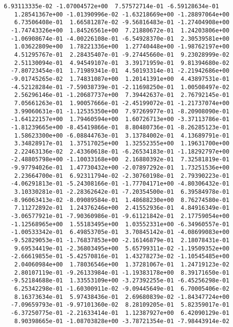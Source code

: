 \documentclass[11pt]{article}
\begin{document}
\begin{Verbatim}[commandchars=\\\{\}]
   6.93113335e-02 -1.07004572e+00  7.57572714e-01 -6.59128634e-01
   1.28541367e+00 -1.01390996e-02 -1.63218669e+00 -1.28897064e+00
   6.73506408e-01  1.66581287e-02 -9.56816483e-01 -1.27404908e+00
  -1.74743326e+00  1.84526561e+00  7.21880672e-01  1.24203806e+00
  -1.06908674e-01 -4.00226108e-01 -6.54928370e-01  2.30539581e+00
   1.03622809e+00  1.78221336e+00  1.27740448e+00 -1.98762197e+00
   4.51295767e-01  2.28435407e-01 -9.27445660e-01  9.23028999e-02
   2.51130094e-01  4.94549107e-01  3.39171959e-01  9.81394680e-02
  -7.80723454e-01  1.71989341e-01  4.50193314e-01 -2.21942686e+00
  -9.01745265e-02  1.74831087e+00  1.20141391e+00  4.43897531e-01
  -4.52128284e-01 -7.59038739e-01 -2.11698250e-01  1.00508497e-02
   2.56296146e-01 -1.20687737e+00  7.39442637e-01  2.76792145e-01
   7.05661263e-01  1.90057666e-01 -2.45199072e-01 -1.21737074e+00
   3.99060631e-01 -1.12535350e+00  7.97269977e-01 -8.20908090e-01
  -1.64122157e+00  1.79460594e+00  1.60726713e+00 -3.37113786e-01
  -1.81239665e+00 -8.45419866e-01  8.80480736e-01 -8.26285123e-01
   1.58623300e+00 -6.08844763e-01  3.13784002e-01  4.13689791e-01
   3.34828917e-01  1.37517025e+00  1.32552355e+00  1.19631700e+00
   2.22463136e-02  2.43360618e-01 -6.26534183e-01 -1.18292797e+00
  -2.48805798e+00 -1.10033168e+00  2.16880392e-01  7.32581819e-01
  -9.97794026e-01  1.47730432e+00 -2.07897292e-01  1.73251536e+00
   2.23664700e-01  6.92311794e-02 -2.30760198e-01  2.79390223e-01
  -4.06291813e-01 -5.24308166e-01 -1.77704171e+00 -4.80306432e-01
   3.10330281e-01 -2.28362642e-01 -7.20354500e-01  6.39584978e-01
  -8.96063413e-02 -8.09089584e-01  1.48688230e+00  8.76274580e-01
   7.11272892e-01  1.24376246e+00  2.41552936e-01  4.84916349e-01
  -3.06577921e-01 -7.90360986e-01 -9.61121842e-01  2.17759054e+00
  -1.12568965e+00  1.55183495e+00  1.03552331e+00 -6.34960557e-01
  -1.00533342e-01  6.49853705e-01  3.70845142e-01 -4.08699083e+00
  -9.52829053e-01 -1.76837853e+00 -2.16146879e-01  2.18078431e-01
   9.69534419e-01 -2.36803495e+00  5.65799311e-02 -1.19509352e+00
  -2.66619855e-01 -5.42570816e-01  1.43278273e-02 -1.10545485e+00
   2.04060984e+00  1.78036546e+00  1.37281067e-01  1.24719123e-02
   2.80107119e-01 -9.26133984e-01 -1.19383178e+00  8.39171650e-01
  -9.52184688e-01  1.33553109e+00 -3.27392255e-01 -6.45256298e-01
   6.25342298e-01 -1.60300911e-02 -9.09445649e-01  6.70005406e-02
   8.16373634e-01  5.97438436e-01  2.69680839e-02 -1.84347724e+00
  -7.09659793e-01 -9.97101360e-02  8.28109205e-01  5.82359017e-01
  -6.37250775e-01 -2.21633414e-01  1.12387927e+00  6.42090129e-01
   8.90398665e-01 -1.08703828e+00 -3.78721354e-01 -7.98443914e-02

\end{Verbatim}
\end{document}
